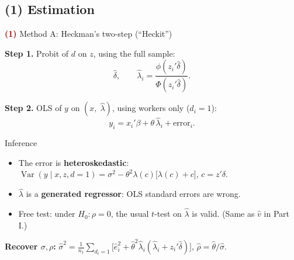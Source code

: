 \documentclass[aspectratio=169,11pt]{beamer}
\newcommand{\Part}[1]{\textcolor{DarkRed}{\textbf{(#1)}}}
\newcommand{\Mills}{\lambda}
\begin{document}
\subsection{(1) Estimation}

\begin{frame}{\Part{1} Method A: Heckman's two-step (``Heckit'')}

\textbf{Step 1.} Probit of $d$ on $z$, using the full sample:
\[
\hat\delta,\qquad \hat\Mills_i=\frac{\phi(z_i'\hat\delta)}{\Phi(z_i'\hat\delta)} .
\]

\textbf{Step 2.} OLS of $y$ on $(x,\;\hat\Mills)$, using workers only ($d_i=1$):
\[
y_i = x_i'\beta + \theta\,\hat\Mills_i + \text{error}_i .
\]

\pause

\begin{block}{Inference}
\begin{itemize}
  \item The error is \textbf{heteroskedastic}:
  $\operatorname{Var}(y\mid x,z,d=1)=\sigma^2-\theta^2\Mills(c)\big[\Mills(c)+c\big]$, $c=z'\delta$.
  \item $\hat\Mills$ is a \textbf{generated regressor}: OLS standard errors are wrong.
  \item Free test: under $H_0:\rho=0$, the usual $t$-test on $\hat\Mills$
        is valid. \hfill (Same as $\hat v$ in Part I.)
\end{itemize}
\end{block}

\pause

\textbf{Recover $\sigma,\rho$:}
$\hat\sigma^2=\frac{1}{n_1}\sum_{d_i=1}\big[\hat e_i^2+\hat\theta^2\hat\Mills_i(\hat\Mills_i+z_i'\hat\delta)\big]$,
\;$\hat\rho=\hat\theta/\hat\sigma$.

\end{frame}
\end{document}
